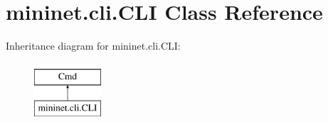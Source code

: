 \hypertarget{classmininet_1_1cli_1_1CLI}{\section{mininet.\-cli.\-C\-L\-I Class Reference}
\label{classmininet_1_1cli_1_1CLI}
}
Inheritance diagram for mininet.\-cli.\-C\-L\-I\-:\begin{figure}[H]
\begin{center}
\leavevmode
\includegraphics[height=2.000000cm]{classmininet_1_1cli_1_1CLI}
\end{center}
\end{figure}
